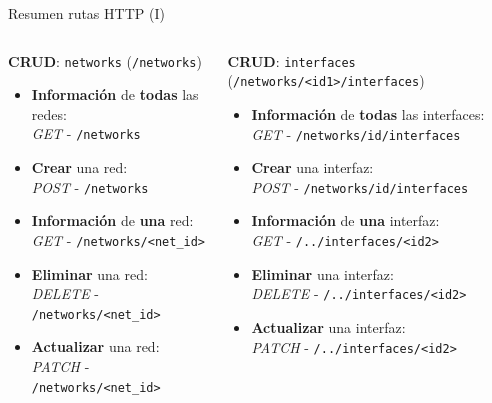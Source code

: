 \documentclass[aspectratio=169,xcolor=dvipsnames]{beamer}
\begin{document}
	\begin{frame}{Resumen rutas HTTP (I)}
		\begin{columns}
			\begin{column}{0.5\textwidth}
				\begin{block}{\textbf{CRUD}: \texttt{networks} (\texttt{/networks})}
					\begin{itemize}
						\item \textbf{Información} de \textbf{todas} las redes: \\ \textit{GET} - \texttt{/networks}
						
						\item \textbf{Crear} una red: \\ \textit{POST} - \texttt{/networks}
						
						\item \textbf{Información} de \textbf{una} red: \\ \textit{GET} - \texttt{/networks/<net\_id>}
						
						\item \textbf{Eliminar} una red: \\ \textit{DELETE} - \texttt{/networks/<net\_id>}
						
						\item \textbf{Actualizar} una red: \\ \textit{PATCH} - \texttt{/networks/<net\_id>}
					\end{itemize}
				\end{block}
			\end{column}
		
			\begin{column}{0.5\textwidth}
				\begin{block}{\textbf{CRUD}: \texttt{interfaces} (\texttt{/networks/<id1>/interfaces})}
					\begin{itemize}
						\item \textbf{Información} de \textbf{todas} las interfaces: \\ \textit{GET} - \texttt{\small /networks/id/interfaces}
						
						\item \textbf{Crear} una interfaz: \\ \textit{POST} - \texttt{\small /networks/id/interfaces}
						
						\item \textbf{Información} de \textbf{una} interfaz: \\ \textit{GET} - \texttt{/../interfaces/<id2>}
						
						\item \textbf{Eliminar} una interfaz: \\ \textit{DELETE} - \texttt{/../interfaces/<id2>}
						
						\item \textbf{Actualizar} una interfaz: \\ \textit{PATCH} - \texttt{/../interfaces/<id2>}
					\end{itemize}
				\end{block}
			\end{column}
		
		\end{columns}
	\end{frame}
\end{document}
